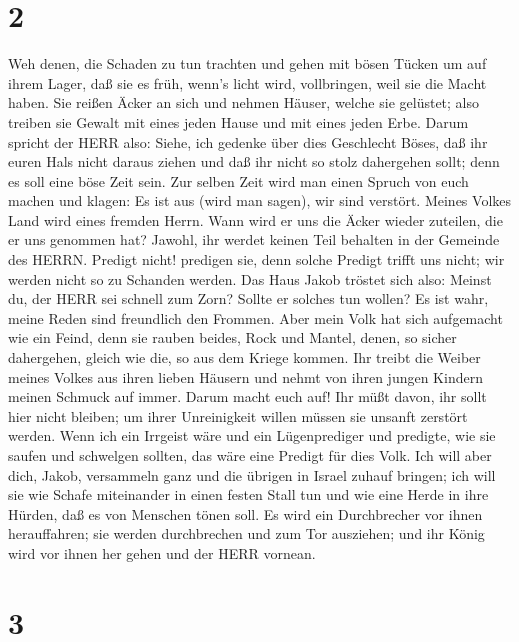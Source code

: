 \hypertarget{section-1}{%
\section{2}\label{section-1}}

 Weh denen, die Schaden zu tun trachten und gehen mit bösen
Tücken um auf ihrem Lager, daß sie es früh, wenn's licht wird,
vollbringen, weil sie die Macht haben.  Sie reißen Äcker an
sich und nehmen Häuser, welche sie gelüstet; also treiben sie Gewalt mit
eines jeden Hause und mit eines jeden Erbe.  Darum spricht
der HERR also: Siehe, ich gedenke über dies Geschlecht Böses, daß ihr
euren Hals nicht daraus ziehen und daß ihr nicht so stolz dahergehen
sollt; denn es soll eine böse Zeit sein.  Zur selben Zeit
wird man einen Spruch von euch machen und klagen: Es ist aus (wird man
sagen), wir sind verstört. Meines Volkes Land wird eines fremden Herrn.
Wann wird er uns die Äcker wieder zuteilen, die er uns genommen hat?
 Jawohl, ihr werdet keinen Teil behalten in der Gemeinde des
HERRN.  Predigt nicht! predigen sie, denn solche Predigt
trifft uns nicht; wir werden nicht so zu Schanden werden. 
Das Haus Jakob tröstet sich also: Meinst du, der HERR sei schnell zum
Zorn? Sollte er solches tun wollen? Es ist wahr, meine Reden sind
freundlich den Frommen.  Aber mein Volk hat sich aufgemacht
wie ein Feind, denn sie rauben beides, Rock und Mantel, denen, so sicher
dahergehen, gleich wie die, so aus dem Kriege kommen.  Ihr
treibt die Weiber meines Volkes aus ihren lieben Häusern und nehmt von
ihren jungen Kindern meinen Schmuck auf immer.  Darum macht
euch auf! Ihr müßt davon, ihr sollt hier nicht bleiben; um ihrer
Unreinigkeit willen müssen sie unsanft zerstört werden. 
Wenn ich ein Irrgeist wäre und ein Lügenprediger und predigte, wie sie
saufen und schwelgen sollten, das wäre eine Predigt für dies Volk.
 Ich will aber dich, Jakob, versammeln ganz und die übrigen
in Israel zuhauf bringen; ich will sie wie Schafe miteinander in einen
festen Stall tun und wie eine Herde in ihre Hürden, daß es von Menschen
tönen soll.  Es wird ein Durchbrecher vor ihnen
herauffahren; sie werden durchbrechen und zum Tor ausziehen; und ihr
König wird vor ihnen her gehen und der HERR vornean.

\hypertarget{section-2}{%
\section{3}\label{section-2}}

